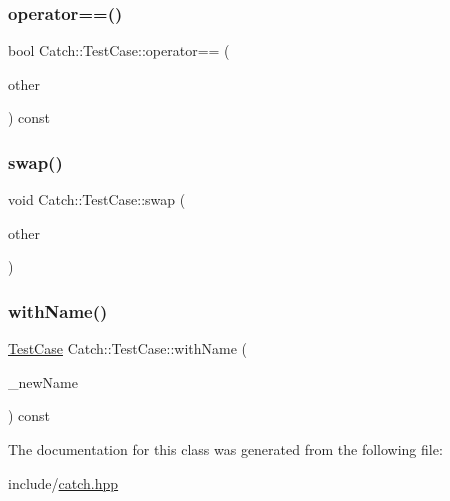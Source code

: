 \mbox{\label{class_catch_1_1_test_case_a5456d03a90f75292835c158f3a3374a1}} 
\subsubsection{\texorpdfstring{operator==()}{operator==()}}
{\footnotesize\ttfamily bool Catch\+::\+Test\+Case\+::operator== (\begin{DoxyParamCaption}\item[{\mbox{\hyperlink{class_catch_1_1_test_case}{Test\+Case}} const \&}]{other }\end{DoxyParamCaption}) const}

\mbox{\label{class_catch_1_1_test_case_aee38f908faf10b905b209ca388275413}} 
\subsubsection{\texorpdfstring{swap()}{swap()}}
{\footnotesize\ttfamily void Catch\+::\+Test\+Case\+::swap (\begin{DoxyParamCaption}\item[{\mbox{\hyperlink{class_catch_1_1_test_case}{Test\+Case}} \&}]{other }\end{DoxyParamCaption})}

\mbox{\label{class_catch_1_1_test_case_a0812e8a216d09b087d5874687009f0d6}} 
\subsubsection{\texorpdfstring{with\+Name()}{withName()}}
{\footnotesize\ttfamily \mbox{\hyperlink{class_catch_1_1_test_case}{Test\+Case}} Catch\+::\+Test\+Case\+::with\+Name (\begin{DoxyParamCaption}\item[{std\+::string const \&}]{\+\_\+new\+Name }\end{DoxyParamCaption}) const}



The documentation for this class was generated from the following file\+:\begin{DoxyCompactItemize}
\item 
include/\mbox{\hyperlink{catch_8hpp}{catch.\+hpp}}\end{DoxyCompactItemize}
